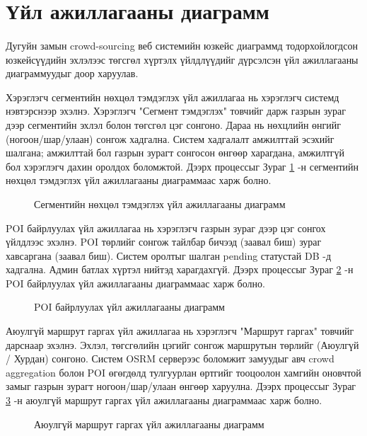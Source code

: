 \section{Үйл ажиллагааны диаграмм}
\paragraph{}
Дугуйн замын crowd-sourcing веб системийн юзкейс диаграммд тодорхойлогдсон юзкейсүүдийн эхлэлээс төгсгөл хүртэлх үйлдлүүдийг дүрсэлсэн үйл ажиллагааны диаграммуудыг доор харуулав.
\par \noindent
Хэрэглэгч сегментийн нөхцөл тэмдэглэх үйл ажиллагаа нь хэрэглэгч системд нэвтэрснээр эхэлнэ. Хэрэглэгч "Сегмент тэмдэглэх" товчийг дарж газрын зураг дээр сегментийн эхлэл болон төгсгөл цэг сонгоно. Дараа нь нөхцлийн өнгийг (ногоон/шар/улаан) сонгож хадгална. Систем хадгалалт амжилттай эсэхийг шалгана; амжилттай бол газрын зурагт сонгосон өнгөөр харагдана, амжилтгүй бол хэрэглэгч дахин оролдох боломжтой. Дээрх процессыг Зураг \ref{fig:ua-segment} -н сегментийн нөхцөл тэмдэглэх үйл ажиллагааны диаграммаас харж болно.
\begin{figure}[H]
    \centering
    \caption{Сегментийн нөхцөл тэмдэглэх үйл ажиллагааны диаграмм}
    \label{fig:ua-segment}
\end{figure}
\par \noindent
POI байрлуулах үйл ажиллагаа нь хэрэглэгч газрын зураг дээр цэг сонгох үйлдлээс эхэлнэ. POI төрлийг сонгож тайлбар бичээд (заавал биш) зураг хавсаргана (заавал биш). Систем оролтыг шалган pending статустай DB -д хадгална. Админ батлах хүртэл нийтэд харагдахгүй. Дээрх процессыг Зураг \ref{fig:ua-poi} -н POI байрлуулах үйл ажиллагааны диаграммаас харж болно.
\begin{figure}[H]
    \centering
    \caption{POI байрлуулах үйл ажиллагааны диаграмм}
    \label{fig:ua-poi}
\end{figure}
\par \noindent
Аюулгүй маршрут гаргах үйл ажиллагаа нь хэрэглэгч "Маршрут гаргах" товчийг дарснаар эхэлнэ. Эхлэл, төгсгөлийн цэгийг сонгож маршрутын төрлийг (Аюулгүй / Хурдан) сонгоно. Систем OSRM серверээс боломжит замуудыг авч crowd aggregation болон POI өгөгдөлд тулгуурлан өртгийг тооцоолон хамгийн оновчтой замыг газрын зурагт ногоон/шар/улаан өнгөөр харуулна. Дээрх процессыг Зураг \ref{fig:ua-route} -н аюулгүй маршрут гаргах үйл ажиллагааны диаграммаас харж болно.
\begin{figure}[H]
    \centering
    \caption{Аюулгүй маршрут гаргах үйл ажиллагааны диаграмм}
    \label{fig:ua-route}
\end{figure}
\par \noindent

